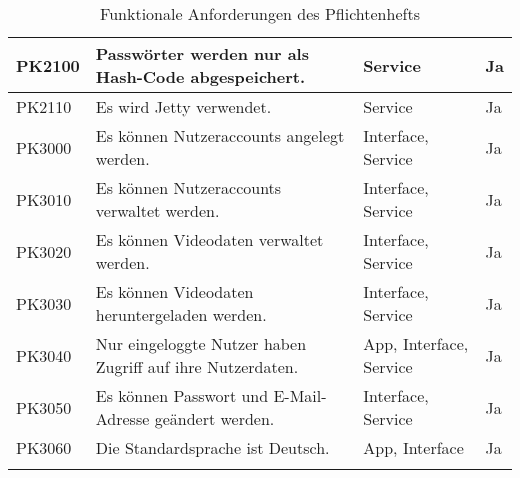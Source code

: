 \begin{longtable}{p{} | p{} | p{} | p{}}
   \\
  \hline 
  PK2100 & Passwörter werden nur als Hash-Code abgespeichert. & Service & Ja
   \\
  \hline 
  PK2110 & Es wird Jetty verwendet. & Service & Ja
   \\
  \hline 
  PK3000 & Es können Nutzeraccounts angelegt werden. & Interface, Service & Ja
   \\
  \hline 
  PK3010 & Es können Nutzeraccounts verwaltet werden. & Interface, Service & Ja
   \\
  \hline 
  PK3020 & Es können Videodaten verwaltet werden. & Interface, Service & Ja
   \\
  \hline 
  PK3030 & Es können Videodaten heruntergeladen werden. & Interface, Service & Ja
   \\
  \hline 
  PK3040 & Nur eingeloggte Nutzer haben Zugriff auf ihre Nutzerdaten. & App, Interface, Service & Ja
   \\
  \hline 
  PK3050 & Es können Passwort und E-Mail-Adresse geändert werden. & Interface, Service & Ja
   \\
  \hline 
  PK3060 & Die Standardsprache ist Deutsch. & App, Interface & Ja
  \\
  \hline
  \caption{Funktionale Anforderungen des Pflichtenhefts}
 \end{longtable}